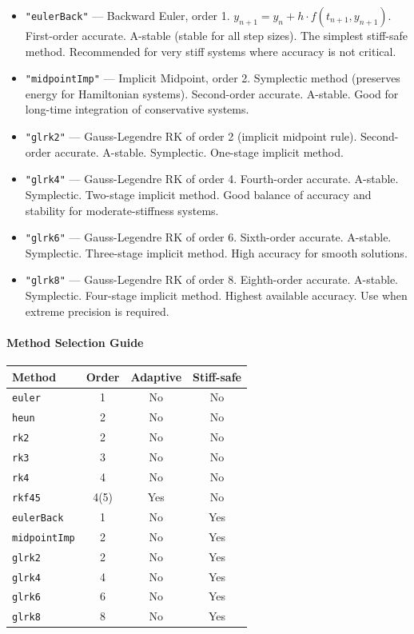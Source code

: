 \begin{itemize}
\item \texttt{"eulerBack"} --- Backward Euler, order 1. $y_{n+1} = y_n + h \cdot f(t_{n+1}, y_{n+1})$. First-order accurate. A-stable (stable for all step sizes). The simplest stiff-safe method. Recommended for very stiff systems where accuracy is not critical.
\item \texttt{"midpointImp"} --- Implicit Midpoint, order 2. Symplectic method (preserves energy for Hamiltonian systems). Second-order accurate. A-stable. Good for long-time integration of conservative systems.
\item \texttt{"glrk2"} --- Gauss-Legendre RK of order 2 (implicit midpoint rule). Second-order accurate. A-stable. Symplectic. One-stage implicit method.
\item \texttt{"glrk4"} --- Gauss-Legendre RK of order 4. Fourth-order accurate. A-stable. Symplectic. Two-stage implicit method. Good balance of accuracy and stability for moderate-stiffness systems.
\item \texttt{"glrk6"} --- Gauss-Legendre RK of order 6. Sixth-order accurate. A-stable. Symplectic. Three-stage implicit method. High accuracy for smooth solutions.
\item \texttt{"glrk8"} --- Gauss-Legendre RK of order 8. Eighth-order accurate. A-stable. Symplectic. Four-stage implicit method. Highest available accuracy. Use when extreme precision is required.
\end{itemize}

\paragraph{Method Selection Guide}

\begin{center}
\begin{tabular}{|l|c|c|c|}
\hline
\textbf{Method} & \textbf{Order} & \textbf{Adaptive} & \textbf{Stiff-safe} \\
\hline
\texttt{euler} & 1 & No & No \\
\texttt{heun} & 2 & No & No \\
\texttt{rk2} & 2 & No & No \\
\texttt{rk3} & 3 & No & No \\
\texttt{rk4} & 4 & No & No \\
\texttt{rkf45} & 4(5) & Yes & No \\
\hline
\texttt{eulerBack} & 1 & No & Yes \\
\texttt{midpointImp} & 2 & No & Yes \\
\texttt{glrk2} & 2 & No & Yes \\
\texttt{glrk4} & 4 & No & Yes \\
\texttt{glrk6} & 6 & No & Yes \\
\texttt{glrk8} & 8 & No & Yes \\
\hline
\end{tabular}
\end{center}

